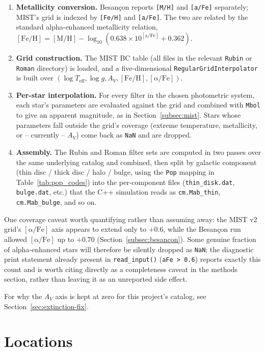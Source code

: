 \documentclass[english,10pt,a4paper]{article}
\begin{document}
	\begin{enumerate}
		\item \textbf{Metallicity conversion.} Besan\c{c}on reports \texttt{[M/H]} and \texttt{[a/Fe]} separately; MIST's grid is indexed by \texttt{[Fe/H]} and \texttt{[a/Fe]}. The two are related by the standard alpha-enhanced metallicity relation, $\mathrm{[Fe/H]} = \mathrm{[M/H]} - \log_{10}\!\left(0.638\times10^{\mathrm{[a/Fe]}} + 0.362\right)$.
		\item \textbf{Grid construction.} The MIST BC table (all files in the relevant \texttt{Rubin} or \texttt{Roman} directory) is loaded, and a five-dimensional \texttt{RegularGridInterpolator} is built over $(\log T_{\mathrm{eff}}, \log g, A_V, \mathrm{[Fe/H]}, \mathrm{[\alpha/Fe]})$.
		\item \textbf{Per-star interpolation.} For every filter in the chosen photometric system, each star's parameters are evaluated against the grid and combined with \texttt{Mbol} to give an apparent magnitude, as in Section~\ref{subsec:mist}. Stars whose parameters fall outside the grid's coverage (extreme temperature, metallicity, or -- currently -- $A_V$) come back as \texttt{NaN} and are dropped.
		\item \textbf{Assembly.} The Rubin and Roman filter sets are computed in two passes over the same underlying catalog and combined, then split by galactic component (thin disc / thick disc / halo / bulge, using the \texttt{Pop} mapping in Table~\ref{tab:pop_codes}) into the per-component files (\texttt{thin\_disk.dat}, \texttt{bulge.dat}, etc.) that the C++ simulation reads as \texttt{cm.Mab\_thin}, \texttt{cm.Mab\_bulge}, and so on.
	\end{enumerate}
	
	One coverage caveat worth quantifying rather than assuming away: the MIST v2 grid's $\mathrm{[\alpha/Fe]}$ axis appears to extend only to $+0.6$, while the Besan\c{c}on run allowed $\mathrm{[\alpha/Fe]}$ up to $+0.70$ (Section~\ref{subsec:besancon}). Some genuine fraction of alpha-enhanced stars will therefore be silently dropped as \texttt{NaN}; the diagnostic print statement already present in \texttt{read\_input()} (\texttt{aFe > 0.6}) reports exactly this count and is worth citing directly as a completeness caveat in the methods section, rather than leaving it as an unreported side effect.
	
	For why the $A_V$ axis is kept at zero for this project's catalog, see Section~\ref{sec:extinction-fix}.
	
	\section{Locations}
	\label{sec:locations}
	
\end{document}
